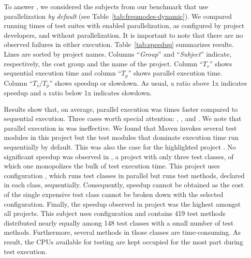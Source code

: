 To answer \numRQSpeedupOne{}, we considered the \numProjectsPar{}
subjects from our benchmark that use parallelization \emph{by default}
(see Table~\ref{tab:freqmodes-dynamic}).  We compared running times
of test suites with enabled parallelization, as configured by project
developers, and without parallelization. It is important to note that
there are no observed failures in either execution.
Table~\ref{tab:speedup} summarizes results.
Lines are sorted by project names.
Columns ``\emph{Group}'' and ``\emph{Subject}'' indicate, respectively,
the cost group and the name of the project.
Column ``$T_s$'' shows sequential execution time and column ``$T_p$''
shows parallel execution time.
Column ``$T_s/T_p$'' shows speedup or slowdown.
As usual, a ratio above 1x indicates speedup and a ratio below 1x
indicates slowdown.


Results show that, on average, parallel execution was
\avgSpeedup{} times faster compared to sequential execution.
Three cases worth special attention: , ,
and .
We note that parallel execution in  was
ineffective.  We found that Maven invokes several test modules in this
project but the test modules that dominate execution time run
sequentially by default. This was also the case for the highlighted
project .
No significant speedup was observed in , a project with
only three test classes, of which one monopolizes the bulk of test
execution time.
This project uses configuration \ParClassSeqMeth{}, which runs test
classes in parallel but runs test methods, declared in each class,
sequentially.
Consequently, speedup cannot be obtained as the cost of the single
expensive test class cannot be broken down with the selected
configuration.
Finally, the speedup observed in project  was
the highest amongst all projects. This subject uses configuration
\ParClassParMeth{} and contains 419 test methods distributed nearly
equally among 148 test classes with a small number of test methods.
Furthermore, several methods in those classes are time-consuming.
As result, the CPUs available for testing are kept occupied for the
most part during test execution.

